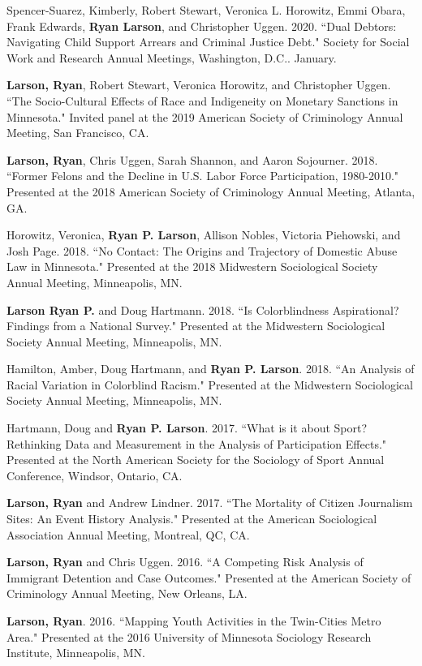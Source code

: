 \documentclass[letterpaper]{article}
\renewenvironment{itemize}{
  \begin{list}{}{
    \setlength{\leftmargin}{1.5em}
  }
}{
  \end{list}
}
\begin{document}
\begin{itemize}
\item Spencer-Suarez, Kimberly, Robert Stewart, Veronica L. Horowitz, Emmi Obara, Frank Edwards, \textbf{Ryan Larson}, and Christopher Uggen. 2020. ``Dual Debtors: Navigating Child Support Arrears and Criminal Justice Debt." Society for Social Work and Research Annual Meetings, Washington, D.C.. January.
\item \textbf{Larson, Ryan}, Robert Stewart, Veronica Horowitz, and Christopher Uggen. ``The Socio-Cultural Effects of Race and Indigeneity on Monetary Sanctions in Minnesota." Invited panel at the 2019 American Society of Criminology Annual Meeting, San Francisco, CA.
\item \textbf{Larson, Ryan}, Chris Uggen, Sarah Shannon, and Aaron Sojourner. 2018. ``Former Felons and the Decline in U.S. Labor Force Participation, 1980-2010." Presented at the 2018 American Society of Criminology Annual Meeting, Atlanta, GA. 
\item Horowitz, Veronica, \textbf{Ryan P. Larson}, Allison Nobles, Victoria Piehowski, and Josh Page.  2018. ``No Contact: The Origins and Trajectory of Domestic Abuse Law in Minnesota." Presented at the 2018 Midwestern Sociological Society Annual Meeting, Minneapolis, MN. 
\item \textbf{Larson Ryan P.} and Doug Hartmann. 2018. ``Is Colorblindness Aspirational? Findings from a National Survey." Presented at the Midwestern Sociological Society Annual Meeting, Minneapolis, MN. 
\item Hamilton, Amber, Doug Hartmann, and \textbf{Ryan P. Larson}. 2018. ``An Analysis of Racial Variation in Colorblind Racism." Presented at the Midwestern Sociological Society Annual Meeting, Minneapolis, MN. 
\item Hartmann, Doug and \textbf{Ryan P. Larson}. 2017. ``What is it about Sport? Rethinking Data and Measurement in the Analysis of Participation Effects."  Presented at the North American Society for the Sociology of Sport Annual Conference, Windsor, Ontario, CA. 
\item \textbf{Larson, Ryan} and Andrew Lindner. 2017. ``The Mortality of Citizen Journalism Sites: An Event History Analysis." Presented at the American Sociological Association Annual Meeting, Montreal, QC, CA.
\item \textbf{Larson, Ryan} and Chris Uggen. 2016. ``A Competing Risk Analysis of Immigrant Detention and Case Outcomes." Presented at the American Society of Criminology Annual Meeting, New Orleans, LA. 
\item \textbf{Larson, Ryan}. 2016. ``Mapping Youth Activities in the Twin-Cities Metro Area." Presented at the 2016 University of Minnesota Sociology Research Institute, Minneapolis, MN. 

\end{itemize}
\end{document}
